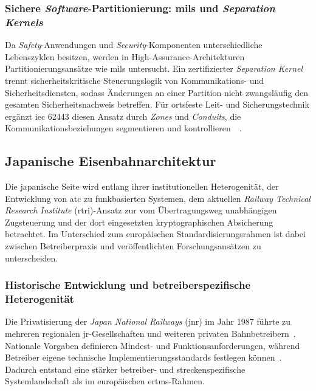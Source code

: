 \documentclass[runningheads]{res/llncs}
\begin{document}
\subsubsection{\texorpdfstring{Sichere \textit{Software}-Partitionierung: \gls{mils} und \textit{Separation Kernels}}{Sichere Software-Partitionierung: MILS und Separation Kernels}}
\label{sec:Sichere_Software-Partitionierung_MILS_und_Separation_Kernels}
Da \textit{Safety}-Anwendungen und \textit{Security}-Komponenten unterschiedliche Lebenszyklen besitzen, werden in High-Assurance-Architekturen Partitionierungsansätze wie \gls{mils} untersucht. Ein zertifizierter \textit{Separation Kernel} trennt sicherheitskritische Steuerungslogik von Kommunikations- und Sicherheitsdiensten, sodass Änderungen an einer Partition nicht zwangsläufig den gesamten Sicherheitsnachweis betreffen. Für ortsfeste Leit- und Sicherungstechnik ergänzt \gls{iec} 62443 diesen Ansatz durch \textit{Zones} und \textit{Conduits}, die Kommunikationsbeziehungen segmentieren und kontrollieren~\cite{schulzIntegration2019}~\cite{tverdyshevCertMILS2019}.

\subsection{Japanische Eisenbahnarchitektur}
\label{sec:Japanische_Eisenbahnarchitektur}

Die japanische Seite wird entlang ihrer institutionellen Heterogenität, der Entwicklung von \gls{atc} zu funkbasierten Systemen, dem aktuellen \textit{Railway Technical Research Institute} (\gls{rtri})-Ansatz zur vom Übertragungsweg unabhängigen Zugsteuerung und der dort eingesetzten kryptographischen Absicherung betrachtet. Im Unterschied zum europäischen Standardisierungsrahmen ist dabei zwischen Betreiberpraxis und veröffentlichten Forschungsansätzen zu unterscheiden.

\subsubsection{Historische Entwicklung und betreiberspezifische Heterogenität}
\label{sec:Historische_Entwicklung_und_betreiberspezifische_Heterogenität}
Die Privatisierung der \textit{Japan National Railways} (\gls{jnr}) im Jahr 1987 führte zu mehreren regionalen \gls{jr}-Gesellschaften und weiteren privaten Bahnbetreibern~\parencite{yanaseJapanese2011}. Nationale Vorgaben definieren Mindest- und Funktionsanforderungen, während Betreiber eigene technische Implementierungsstandards festlegen können~\parencite{yanaseJapanese2011}. Dadurch entstand eine stärker betreiber- und streckenspezifische Systemlandschaft als im europäischen \gls{ertms}-Rahmen.
\end{document}
